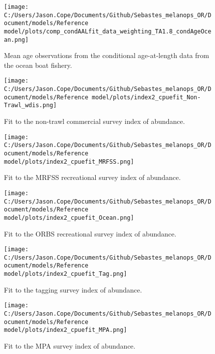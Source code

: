 \documentclass[11pt,
  english,
  letterpaper,
]{article}
\begin{document}
\newpage

\begin{figure}
\centering
\texttt{[image: C:/Users/Jason.Cope/Documents/Github/Sebastes\_melanops\_OR/Document/models/Reference model/plots/comp\_condAALfit\_data\_weighting\_TA1.8\_condAgeOcean.png]}
\caption{Mean age observations from the conditional age-at-length data from the ocean boat fishery.\label{fig:ocean-mean-caal}}
\end{figure}

\newpage

\begin{figure}
\centering
\texttt{[image: C:/Users/Jason.Cope/Documents/Github/Sebastes\_melanops\_OR/Document/models/Reference model/plots/index2\_cpuefit\_Non-Trawl\_wdis.png]}
\caption{Fit to the non-trawl commercial survey index of abundance.\label{fig:nontrawl-index-fit}}
\end{figure}

\newpage

\begin{figure}
\centering
\texttt{[image: C:/Users/Jason.Cope/Documents/Github/Sebastes\_melanops\_OR/Document/models/Reference model/plots/index2\_cpuefit\_MRFSS.png]}
\caption{Fit to the MRFSS recreational survey index of abundance.\label{fig:mrfss-index-fit}}
\end{figure}

\newpage

\begin{figure}
\centering
\texttt{[image: C:/Users/Jason.Cope/Documents/Github/Sebastes\_melanops\_OR/Document/models/Reference model/plots/index2\_cpuefit\_Ocean.png]}
\caption{Fit to the ORBS recreational survey index of abundance.\label{fig:orbs-index-fit}}
\end{figure}

\newpage

\begin{figure}
\centering
\texttt{[image: C:/Users/Jason.Cope/Documents/Github/Sebastes\_melanops\_OR/Document/models/Reference model/plots/index2\_cpuefit\_Tag.png]}
\caption{Fit to the tagging survey index of abundance.\label{fig:tag-index-fit}}
\end{figure}

\newpage

\begin{figure}
\centering
\texttt{[image: C:/Users/Jason.Cope/Documents/Github/Sebastes\_melanops\_OR/Document/models/Reference model/plots/index2\_cpuefit\_MPA.png]}
\caption{Fit to the MPA survey index of abundance.\label{fig:mpa-index-fit}}
\end{figure}
\end{document}
